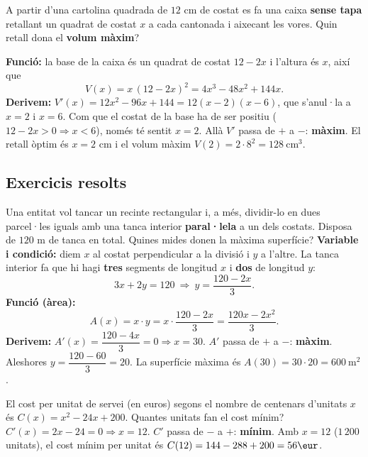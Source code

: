 \begin{exemple}
A partir d'una cartolina quadrada de $12$ cm de costat es fa una caixa \textbf{sense
tapa} retallant un quadrat de costat $x$ a cada cantonada i aixecant les vores. Quin
retall dona el \textbf{volum màxim}?

\medskip
\noindent\textbf{Funció:} la base de la caixa és un quadrat de costat $12-2x$ i l'altura
és $x$, així que
\[
V(x)=x\,(12-2x)^2=4x^3-48x^2+144x.
\]
\noindent\textbf{Derivem:} $V'(x)=12x^2-96x+144=12(x-2)(x-6)$, que s'anul·la a $x=2$ i
$x=6$. Com que el costat de la base ha de ser positiu ($12-2x>0\Rightarrow x<6$), només
té sentit $x=2$. Allà $V'$ passa de $+$ a $-$: \textbf{màxim}. El retall òptim és $x=2$
cm i el volum màxim $V(2)=2\cdot 8^2=128\ \text{cm}^3$.
\end{exemple}

\subsection{Exercicis resolts}

\begin{exresolt}
Una entitat vol tancar un recinte rectangular i, a més, dividir-lo en dues parcel·les
iguals amb una tanca interior \textbf{paral·lela} a un dels costats. Disposa de $120$ m
de tanca en total. Quines mides donen la màxima superfície?
\solucio
\textbf{Variable i condició:} diem $x$ al costat perpendicular a la divisió i $y$ a
l'altre. La tanca interior fa que hi hagi \textbf{tres} segments de longitud $x$ i
\textbf{dos} de longitud $y$:
\[
3x+2y=120 \ \Rightarrow\ y=\frac{120-2x}{3}.
\]
\textbf{Funció (àrea):}
\[
A(x)=x\cdot y=x\cdot\frac{120-2x}{3}=\frac{120x-2x^2}{3}.
\]
\textbf{Derivem:} $A'(x)=\dfrac{120-4x}{3}=0 \Rightarrow x=30$. $A'$ passa de $+$ a $-$:
\textbf{màxim}. Aleshores $y=\dfrac{120-60}{3}=20$. La superfície màxima és
$A(30)=30\cdot 20=600\ \text{m}^2$.
\end{exresolt}

\begin{exresolt}
El cost per unitat de servei (en euros) segons el nombre de centenars d'unitats $x$ és
$C(x)=x^2-24x+200$. Quantes unitats fan el cost mínim?
\solucio
$C'(x)=2x-24=0\Rightarrow x=12$. $C'$ passa de $-$ a $+$: \textbf{mínim}. Amb $x=12$
($1\,200$ unitats), el cost mínim per unitat és $C(12)=144-288+200=56\eur$.
\end{exresolt}

